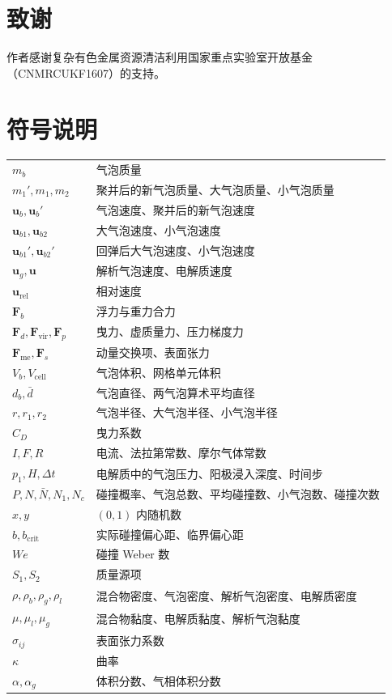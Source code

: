 \documentclass[UTF8,zihao=-4,fontset=fandol]{ctexart}
\newcommand{\vect}[1]{\bm{#1}}
\begin{document}
\section*{致谢}

作者感谢复杂有色金属资源清洁利用国家重点实验室开放基金（CNMRCUKF1607）的支持。

\section*{符号说明}

\begin{longtable}{p{}p{}}
$m_b$ & 气泡质量\\
$m_1',m_1,m_2$ & 聚并后的新气泡质量、大气泡质量、小气泡质量\\
$\vect u_b,\vect u_b'$ & 气泡速度、聚并后的新气泡速度\\
$\vect u_{b1},\vect u_{b2}$ & 大气泡速度、小气泡速度\\
$\vect u_{b1}',\vect u_{b2}'$ & 回弹后大气泡速度、小气泡速度\\
$\vect u_g,\vect u$ & 解析气泡速度、电解质速度\\
$\vect u_{\mathrm{rel}}$ & 相对速度\\
$\vect F_b$ & 浮力与重力合力\\
$\vect F_d,\vect F_{\mathrm{vir}},\vect F_p$ & 曳力、虚质量力、压力梯度力\\
$\vect F_{\mathrm{me}},\vect F_s$ & 动量交换项、表面张力\\
$V_b,V_{\mathrm{cell}}$ & 气泡体积、网格单元体积\\
$d_b,\bar d$ & 气泡直径、两气泡算术平均直径\\
$r,r_1,r_2$ & 气泡半径、大气泡半径、小气泡半径\\
$C_D$ & 曳力系数\\
$I,F,R$ & 电流、法拉第常数、摩尔气体常数\\
$p_1,H,\Delta t$ & 电解质中的气泡压力、阳极浸入深度、时间步\\
$P,N,\bar N,N_1,N_c$ & 碰撞概率、气泡总数、平均碰撞数、小气泡数、碰撞次数\\
$x,y$ & $(0,1)$ 内随机数\\
$b,b_{\mathrm{crit}}$ & 实际碰撞偏心距、临界偏心距\\
$We$ & 碰撞 Weber 数\\
$S_1,S_2$ & 质量源项\\
$\rho,\rho_b,\rho_g,\rho_l$ & 混合物密度、气泡密度、解析气泡密度、电解质密度\\
$\mu,\mu_l,\mu_g$ & 混合物黏度、电解质黏度、解析气泡黏度\\
$\sigma_{ij}$ & 表面张力系数\\
$\kappa$ & 曲率\\
$\alpha,\alpha_g$ & 体积分数、气相体积分数\\
\end{longtable}
\end{document}
